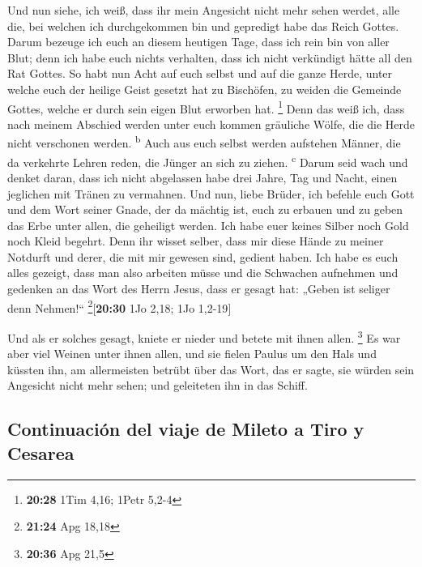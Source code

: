  Und nun siehe, ich weiß, dass ihr mein Angesicht nicht
mehr sehen werdet, alle die, bei welchen ich durchgekommen bin und
gepredigt habe das Reich Gottes.  Darum bezeuge ich euch
an diesem heutigen Tage, dass ich rein bin von aller Blut;
 denn ich habe euch nichts verhalten, dass ich nicht
verkündigt hätte all den Rat Gottes.  So habt nun Acht
auf euch selbst und auf die ganze Herde, unter welche euch der heilige
Geist gesetzt hat zu Bischöfen, zu weiden die Gemeinde Gottes, welche er
durch sein eigen Blut erworben hat. \footnote{\textbf{20:28} 1Tim 4,16;
  1Petr 5,2-4}  Denn das weiß ich, dass nach meinem
Abschied werden unter euch kommen gräuliche Wölfe, die die Herde nicht
verschonen werden. \textsuperscript{b}  Auch aus euch
selbst werden aufstehen Männer, die da verkehrte Lehren reden, die
Jünger an sich zu ziehen. \textsuperscript{c}  Darum seid
wach und denket daran, dass ich nicht abgelassen habe drei Jahre, Tag
und Nacht, einen jeglichen mit Tränen zu vermahnen.  Und
nun, liebe Brüder, ich befehle euch Gott und dem Wort seiner Gnade, der
da mächtig ist, euch zu erbauen und zu geben das Erbe unter allen, die
geheiligt werden.  Ich habe euer keines Silber noch Gold
noch Kleid begehrt.  Denn ihr wisset selber, dass mir
diese Hände zu meiner Notdurft und derer, die mit mir gewesen sind,
gedient haben.  Ich habe es euch alles gezeigt, dass man
also arbeiten müsse und die Schwachen aufnehmen und gedenken an das Wort
des Herrn Jesus, dass er gesagt hat: „Geben ist seliger denn Nehmen!{}``
\footnote{\textbf{21:24} Apg 18,18}{[}\textbf{20:30} 1Jo 2,18; 1Jo
1,2-19{]}

 Und als er solches gesagt, kniete er nieder und betete
mit ihnen allen. \footnote{\textbf{20:36} Apg 21,5}  Es
war aber viel Weinen unter ihnen allen, und sie fielen Paulus um den
Hals und küssten ihn,  am allermeisten betrübt über das
Wort, das er sagte, sie würden sein Angesicht nicht mehr sehen; und
geleiteten ihn in das Schiff.

\hypertarget{continuaciuxf3n-del-viaje-de-mileto-a-tiro-y-cesarea}{%
\subsection{Continuación del viaje de Mileto a Tiro y
Cesarea}\label{continuaciuxf3n-del-viaje-de-mileto-a-tiro-y-cesarea}}

